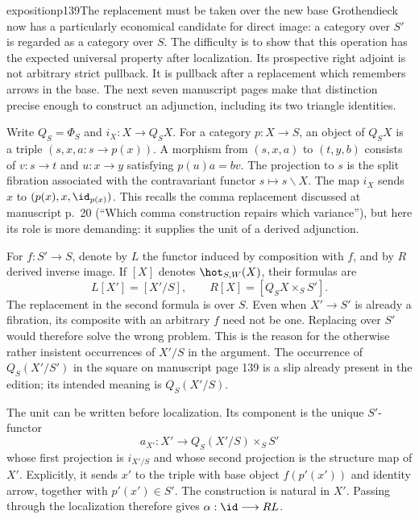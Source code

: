 \begin{dcomment}{exposition}{p139}{The replacement must be taken over the new base}
Grothendieck now has a particularly economical candidate for direct image: a category over $S'$ is regarded as a category over $S$. The difficulty is to show that this operation has the expected universal property after localization. Its prospective right adjoint is not arbitrary strict pullback. It is pullback after a replacement which remembers arrows in the base. The next seven manuscript pages make that distinction precise enough to construct an adjunction, including its two triangle identities.

Write $Q_S=\Phi_S$ and $i_X:X\longrightarrow Q_SX$. For a category $p:X\longrightarrow S$, an object of $Q_SX$ is a triple $(s,x,a:s\longrightarrow p(x))$. A morphism from $(s,x,a)$ to $(t,y,b)$ consists of $v:s\longrightarrow t$ and $u:x\longrightarrow y$ satisfying $p(u)a=bv$. The projection to $s$ is the split fibration associated with the contravariant functor $s\longmapsto s\backslash X$. The map $i_X$ sends $x$ to $(p(x),x,\id_{p(x)})$. This recalls the comma replacement discussed at manuscript p.~20 (``Which comma construction repairs which variance''), but here its role is more demanding: it supplies the unit of a derived adjunction.

For $f:S'\longrightarrow S$, denote by $L$ the functor induced by composition with $f$, and by $R$ derived inverse image. If $[X]$ denotes $\hot_{S,W}(X)$, their formulas are
\[
 L[X']=[X'/S],\qquad R[X]=[Q_SX\times_SS'].
\]
The replacement in the second formula is over $S$. Even when $X'\longrightarrow S'$ is already a fibration, its composite with an arbitrary $f$ need not be one. Replacing over $S'$ would therefore solve the wrong problem. This is the reason for the otherwise rather insistent occurrences of $X'/S$ in the argument. The occurrence of $Q_S(X'/S')$ in the square on manuscript page 139 is a slip already present in the edition; its intended meaning is $Q_S(X'/S)$.

The unit can be written before localization. Its component is the unique $S'$-functor
\[
 a_{X'}:X'\longrightarrow Q_S(X'/S)\times_SS'
\]
whose first projection is $i_{X'/S}$ and whose second projection is the structure map of $X'$. Explicitly, it sends $x'$ to the triple with base object $f(p'(x'))$ and identity arrow, together with $p'(x')\in S'$. The construction is natural in $X'$. Passing through the localization therefore gives $\alpha:\id\longrightarrow RL$.


\end{dcomment}
